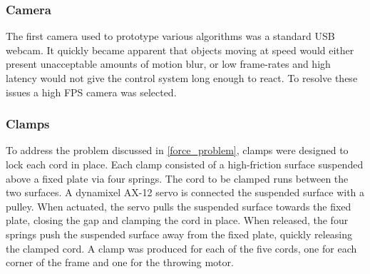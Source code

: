 \documentclass[conference]{IEEEtran}
\begin{document}
	
	
	\subsubsection{Camera}
	The first camera used to prototype various algorithms was a standard USB webcam. It quickly became apparent that objects moving at speed would either present unacceptable amounts of motion blur, or low frame-rates and high latency would not give the control system long enough to react. To resolve these issues  a high FPS camera was selected. 
	
		\subsubsection{Clamps}
		To address the problem discussed in \ref{force_problem}, clamps were designed to lock each cord in place. Each clamp consisted of a high-friction surface suspended above a fixed plate via four springs. The cord to be clamped runs between the two surfaces. A dynamixel AX-12 servo is connected the suspended surface with a pulley. When actuated, the servo pulls the suspended surface towards the fixed plate, closing the gap and clamping the cord in place. When released, the four springs push the suspended surface away from the fixed plate, quickly releasing the clamped cord. A clamp was produced for each of the five cords, one for each corner of the frame and one for the throwing motor.
		
\end{document}
